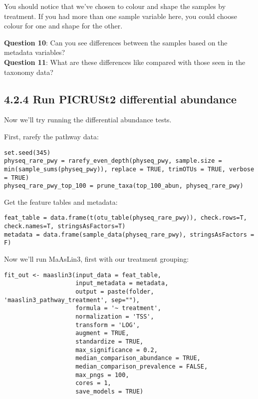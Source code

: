 \documentclass[
]{book}
\begin{document}
You should notice that we've chosen to colour and shape the samples by treatment. If you had more than one sample variable here, you could choose colour for one and shape for the other.

\textbf{Question 10}: Can you see differences between the samples based on the metadata variables?\\
\textbf{Question 11}: What are these differences like compared with those seen in the taxonomy data?

\subsection{4.2.4 Run PICRUSt2 differential abundance}\label{run-picrust2-differential-abundance}

Now we'll try running the differential abundance tests.

First, rarefy the pathway data:

\begin{verbatim}
set.seed(345)
physeq_rare_pwy = rarefy_even_depth(physeq_pwy, sample.size = min(sample_sums(physeq_pwy)), replace = TRUE, trimOTUs = TRUE, verbose = TRUE)
physeq_rare_pwy_top_100 = prune_taxa(top_100_abun, physeq_rare_pwy)
\end{verbatim}

Get the feature tables and metadata:

\begin{verbatim}
feat_table = data.frame(t(otu_table(physeq_rare_pwy)), check.rows=T, check.names=T, stringsAsFactors=T)
metadata = data.frame(sample_data(physeq_rare_pwy), stringsAsFactors = F)
\end{verbatim}

Now we'll run MaAsLin3, first with our treatment grouping:

\begin{verbatim}
fit_out <- maaslin3(input_data = feat_table,
                    input_metadata = metadata,
                    output = paste(folder, 'maaslin3_pathway_treatment', sep=""),
                    formula = '~ treatment',
                    normalization = 'TSS',
                    transform = 'LOG',
                    augment = TRUE,
                    standardize = TRUE,
                    max_significance = 0.2,
                    median_comparison_abundance = TRUE,
                    median_comparison_prevalence = FALSE,
                    max_pngs = 100,
                    cores = 1,
                    save_models = TRUE)
\end{verbatim}
\end{document}
